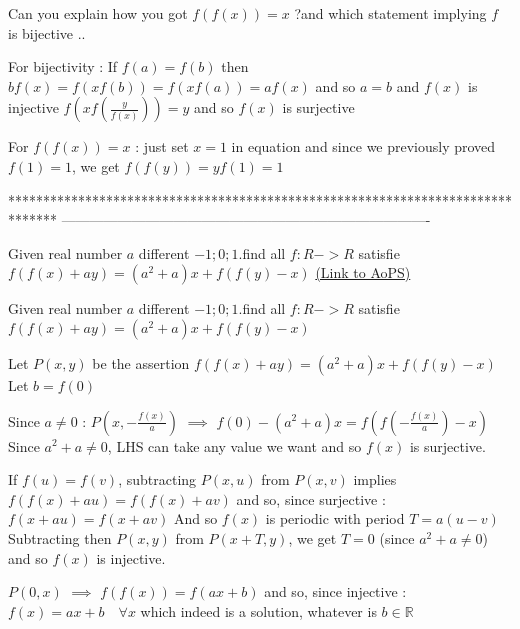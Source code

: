 \begin{solution}
	\begin{tcolorbox}Can you explain how you got $f(f(x)) =x$ ?and which statement implying $f$ is bijective ..\end{tcolorbox}
For bijectivity :
If $f(a)=f(b)$ then $bf(x)=f(xf(b))=f(xf(a))=af(x)$ and so $a=b$ and $f(x)$ is injective
$f(xf(\frac y {f(x)}))=y$ and so $f(x)$ is surjective

For $f(f(x))=x$ : just set $x=1$ in equation and since we previously proved $f(1)=1$, we get $f(f(y))=yf(1)=1$


\end{solution}
*******************************************************************************
-------------------------------------------------------------------------------

\begin{problem}
	Given real number $a$ different $-1;0;1$.find all $f:R->R$ satisfie 
$f(f(x)+ay)=(a^2+a)x+f(f(y)-x)$
	\flushright \href{https://artofproblemsolving.com/community/c6h1522731}{(Link to AoPS)}
\end{problem}



\begin{solution}
	\begin{tcolorbox}Given real number $a$ different $-1;0;1$.find all $f:R->R$ satisfie 
$f(f(x)+ay)=(a^2+a)x+f(f(y)-x)$\end{tcolorbox}
Let $P(x,y)$ be the assertion $f(f(x)+ay)=(a^2+a)x+f(f(y)-x)$
Let $b=f(0)$

Since $a\ne 0$ : $P(x,-\frac{f(x)}a)$ $\implies$ $f(0)-(a^2+a)x=f(f(-\frac{f(x)}a)-x)$
Since $a^2+a\ne 0$, LHS can take any value we want and so $f(x)$ is surjective.

If $f(u)=f(v)$, subtracting $P(x,u)$ from $P(x,v)$ implies $f(f(x)+au)=f(f(x)+av)$ and so, since surjective :
$f(x+au)=f(x+av)$
And so $f(x)$ is periodic with period $T=a(u-v)$
Subtracting then $P(x,y)$ from $P(x+T,y)$, we get $T=0$ (since $a^2+a\ne 0$) and so $f(x)$ is injective.

$P(0,x)$ $\implies$ $f(f(x))=f(ax+b)$ and so, since injective :
$\boxed{f(x)=ax+b\quad\forall x}$ which indeed is a solution, whatever is $b\in\mathbb R$



\end{solution}



